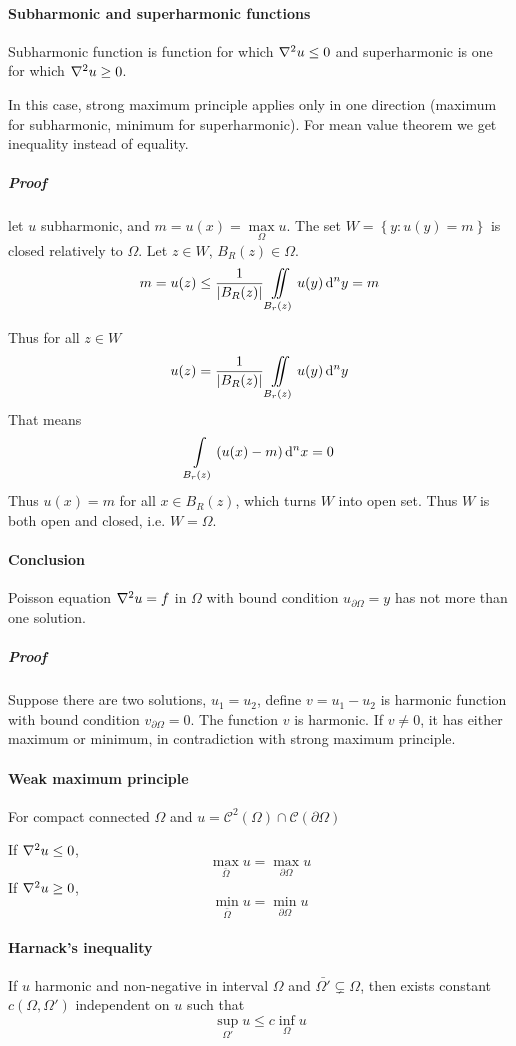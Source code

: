 	\paragraph{Subharmonic and superharmonic functions}
	Subharmonic function is function for which $\laplacian{u}\leq 0$ and superharmonic is one for which $\laplacian{u}\geq0$.
	
	In this case, strong maximum principle applies only in one direction (maximum for subharmonic, minimum for superharmonic). For mean value theorem we get inequality instead of equality.
	
	\subparagraph{Proof}
	let $u$ subharmonic, and $m = u(x) = \max\limits_{\Omega} u$.
	The set $W= \left\{ y: u(y)=m \right\} $ is closed relatively to $\Omega$.
	Let $z\in W$, $B_R(z) \in \Omega$.
	$$m = u(z) \leq \frac{1}{\abs{B_R(z)}} \iint\limits_{B_r(z)}  u(y) \dd[n]{y} = m$$
	
	Thus for all $z\in W$
	$$u(z) = \frac{1}{\abs{B_R(z)}} \iint\limits_{B_r(z)} u(y) \dd[n]{y}$$
	That means
	$$\int\limits_{B_r(z)} \qty(u(x) - m) \dd[n]{x}= 0$$
	Thus $u(x) = m$ for all $x\in B_R(z)$, which turns $W$ into open set. Thus $W$ is both open and closed, i.e. $W=\Omega$.
	
	\paragraph{Conclusion}
	Poisson equation $\laplacian{u} = f$ in $\Omega$ with bound condition $u_{\partial \Omega} = y$ has not more than one solution.
	\subparagraph{Proof}
	Suppose there are two solutions, $u_1=u_2$, define $v=u_1-u_2$ is harmonic function with bound condition  $v_{\partial \Omega} = 0$. The function $v$ is harmonic. If $v\neq 0$, it has either maximum or minimum, in contradiction with strong maximum principle.
	
	\paragraph{Weak maximum principle}
	For compact connected $\Omega$ and $u = \mathcal{C}^2(\Omega) \cap \mathcal{C}(\partial \Omega)$ 
	
	If $\laplacian{u} \leq 0$, 
	$$\max\limits_{\bar{\Omega}} u = \max\limits_{\partial \Omega} u$$
	If $\laplacian{u} \geq 0$, 
	$$\min\limits_{\bar{\Omega}} u = \min\limits_{\partial \Omega} u$$
	\paragraph{Harnack's inequality}
	If $u$ harmonic and non-negative in interval $\Omega$ and $\bar{\Omega'} \subsetneq \Omega$, then exists constant $c(\Omega, \Omega')$ independent on $u$ such that
	$$\sup\limits_{\Omega'} u \leq c \inf\limits_{\Omega} u$$
	